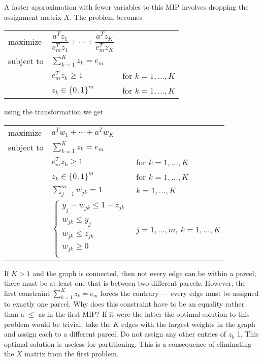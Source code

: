 A faster approximation with fewer variables to this MIP involves
dropping the assignment matrix $X$. The problem becomes

\begin{center}
\bgroup
\def\arraystretch{1.5}
\begin{tabular}{l l l}
maximize   & $\dfrac{a^T z_1}{e_m^T z_1} + \cdots +
              \dfrac{a^T z_K}{e_m^T z_K}$ \\
subject to & $\sum_{k=1}^K z_k = e_m$ \\
           & $e_m^T z_k \geq 1$   & for $k = 1, ..., K$ \\
           & $z_k \in \{0, 1\}^m$ & for $k = 1, ..., K$ \\
\end{tabular}
\egroup
\end{center}

using the \cite{Li:94} transformation we get

\begin{center}
\bgroup
\def\arraystretch{1.5}
\begin{tabular}{l l l}
maximize   & $a^T w_1 + \cdots + a^T w_K$ \\
subject to & $\sum_{k=1}^K z_k = e_m$ \\
           & $e_m^T z_k \geq 1$  & for $k = 1, ..., K$ \\
           & $z_k \in \{0, 1\}^m$ & for $k = 1, ..., K$ \\
           & $\sum_{j=1}^m w_{jk} = 1$ & $k = 1, ..., K$ \\
           & $\begin{cases}
                y_j - w_{jk} \leq 1 - z_{jk} \\
                w_{jk} \leq y_j \\
                w_{jk} \leq z_{jk} \\
                w_{jk} \geq 0 \\
             \end{cases}$
           & $j = 1, ..., m$, $k = 1, ..., K$ \\
\end{tabular}
\egroup
\end{center}

If $K > 1$ and the graph is connected, then not every edge can be
within a parcel; there must be at least one that is between two
different parcels. However, the first constraint
$\sum_{k=1}^K z_k = e_m$ forces the contrary --- every edge must be
assigned to exactly one parcel. Why does this constraint have to be an
equality rather than a $\leq$ as in the first MIP? If it were the latter
the optimal solution to this problem would be trivial: take the $K$
edges with the largest weights in the graph and assign each to a
different parcel. Do not assign any other entries of $z_k$ 1. This
optimal solution is useless for partitioning. This is a consequence of
eliminating the $X$ matrix from the first problem.

